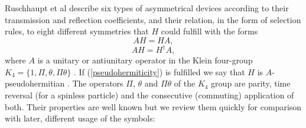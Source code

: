 %
%
Ruschhaupt et al \cite{Ruschhaupt2017} describe  six types of  asymmetrical devices according to their transmission and reflection coefficients, and their relation,  in the form of selection rules,  to eight different symmetries that $H$ could fulfill
with the forms
%
\begin{equation}
AH=HA, \label{commutation}
\end{equation}
%
\begin{equation}
AH=H^{\dagger}A, \label{pseudohermiticity}
\end{equation}
%
%
where $A$ is a unitary or antiunitary operator in the Klein four-group $K_{4}=\lbrace 1,\Pi,\theta,\Pi\theta \rbrace$ \cite{Ruschhaupt2017}.
If (\ref{pseudohermiticity})  is fulfilled we say that $H$ is $A$-pseudohermitian \cite{Mostafazadeh2010,Ruschhaupt2017}.
The operators $\Pi$, $\theta$ and $\Pi\theta$ of the $K_{4}$ group are parity, time reversal (for a spinless particle) and the consecutive (commuting) application of both. Their properties are well known but we review them quickly for comparison with later,  different
usage of the symbols:

